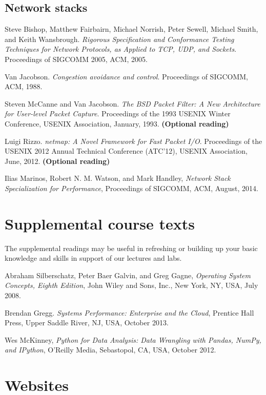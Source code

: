 \documentclass[a4paper,10pt]{article}
\begin{document}
\subsection*{Network stacks}

Steve Bishop, Matthew Fairbairn, Michael Norrish, Peter Sewell, Michael Smith,
and Keith Wansbrough.  \textit{Rigorous Specification and Conformance Testing
Techniques for Network Protocols, as Applied to TCP, UDP, and Sockets}.
Proceedings of SIGCOMM 2005, ACM, 2005.

\medskip
\noindent
Van Jacobson.  \textit{Congestion avoidance and control}.  Proceedings of
SIGCOMM, ACM, 1988.

\medskip
\noindent
Steven McCanne and Van Jacobson.  \textit{The BSD Packet Filter: A New
Architecture for User-level Packet Capture}.  Proceedings of the 1993 USENIX
Winter Conference, USENIX Association, January, 1993.  \textbf{(Optional
reading)}

\medskip
\noindent
Luigi Rizzo.  \textit{netmap: A Novel Framework for Fast Packet I/O}.
Proceedings of the USENIX 2012 Annual Technical Conference (ATC'12), USENIX
Association, June, 2012.
\textbf{(Optional reading)}

\medskip
\noindent
Ilias Marinos, Robert N. M. Watson, and Mark Handley, \textit{Network Stack
Specialization for Performance}, Proceedings of SIGCOMM, ACM, August, 2014.

\section*{Supplemental course texts}

The supplemental readings may be useful in refreshing or building up your
basic knowledge and skills in support of our lectures and labs.

\medskip

\noindent
Abraham Silberschatz, Peter Baer Galvin, and Greg Gagne, \textit{Operating
System Concepts, Eighth Edition}, John Wiley and Sons, Inc., New York, NY, USA,
July 2008.

\medskip
\noindent
Brendan Gregg. \textit{Systems Performance: Enterprise and the Cloud},
Prentice Hall Press, Upper Saddle River, NJ, USA, October 2013.

\medskip
\noindent
Wes McKinney, \textit{Python for Data Analysis: Data Wrangling with Pandas,
NumPy, and IPython}, O'Reilly Media, Sebastopol, CA, USA, October 2012.

\section*{Websites}
\end{document}

